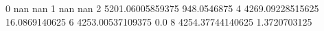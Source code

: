 0 nan nan
1 nan nan
2 5201.06005859375 948.0546875
4 4269.09228515625 16.0869140625
6 4253.00537109375 0.0
8 4254.37744140625 1.3720703125
